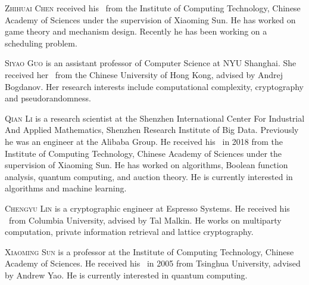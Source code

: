 \documentclass{toc}
\begin{document}
%
%
%
%
%
%
%
%
%
%
%
%
%
%
%
%
%
%
%
%
\begin{tocaboutauthors}
\begin{tocabout}[chen]
\textsc{Zhihuai Chen} received his \phd\ from the Institute of Computing Technology, Chinese Academy of Sciences under the supervision of Xiaoming Sun. He has worked on game theory and %
mechanism design.   %
%
Recently he has been working on a scheduling problem.  %
\end{tocabout}

\begin{tocabout}[guo] 
\textsc{Siyao Guo} is an assistant professor of Computer Science at NYU Shanghai. She received her \phd\ from the Chinese University of Hong Kong, advised by Andrej Bogdanov. Her research interests include computational complexity, cryptography and pseudorandomness. 
\end{tocabout}

\begin{tocabout}[li] 
\textsc{Qian Li} %
is  %
a %
research scientist at the Shenzhen International Center For Industrial  And Applied Mathematics, Shenzhen Research Institute of Big Data. Previously %
he was  %
an engineer at
the  %
Alibaba Group. He received his \phd\ in 
2018 from the Institute of Computing Technology, Chinese Academy of Sciences under the supervision of Xiaoming Sun. He has worked on algorithms, 
%
Boolean %
function analysis, quantum computing, and auction theory. He is currently interested
in algorithms and 
%
machine learning. %
\end{tocabout}

\begin{tocabout}[lin]
%
%
\textsc{Chengyu Lin} is a cryptographic engineer at Espresso Systems. 
He received his \phd\ from %
Columbia University, advised by Tal Malkin. He works on multiparty 
computation, private information retrieval and lattice cryptography.
\end{tocabout}

\begin{tocabout}[sun]
\textsc{Xiaoming Sun} is a professor at the Institute of Computing Technology, Chinese Academy of Sciences. He received his \phd\ in 2005 from Tsinghua University, advised by Andrew Yao. He is currently interested in quantum computing.
\end{tocabout}

\end{tocaboutauthors}
\end{document}
